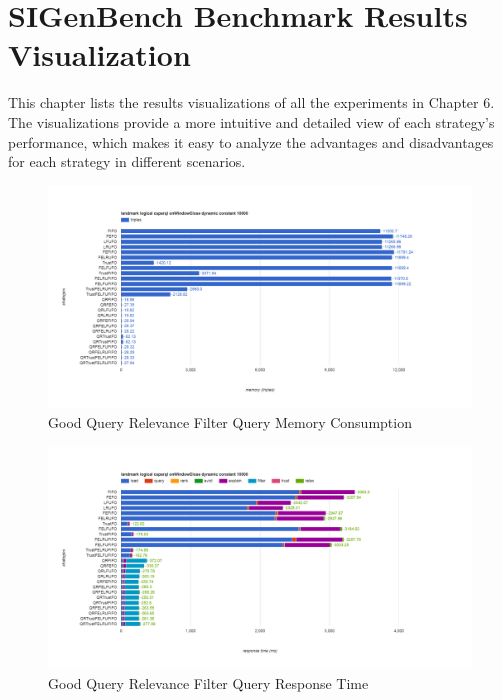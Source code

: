 \chapter{SIGenBench Benchmark Results Visualization}
This chapter lists the results visualizations of all the experiments in Chapter 6. 
The visualizations provide a more intuitive and detailed view of each strategy's performance, which makes it easy to analyze the advantages and disadvantages for each strategy in different scenarios. 
\begin{figure}[!htbp]
    \centering
    \includegraphics[width=\textwidth]{img/app3-gqr-m.png}
    \caption{Good Query Relevance Filter Query Memory Consumption}
\end{figure}
\begin{figure}[!htbp]
    \centering
    \includegraphics[width=\textwidth]{img/app3-gqr-r.png}
    \caption{Good Query Relevance Filter Query Response Time}
\end{figure}
